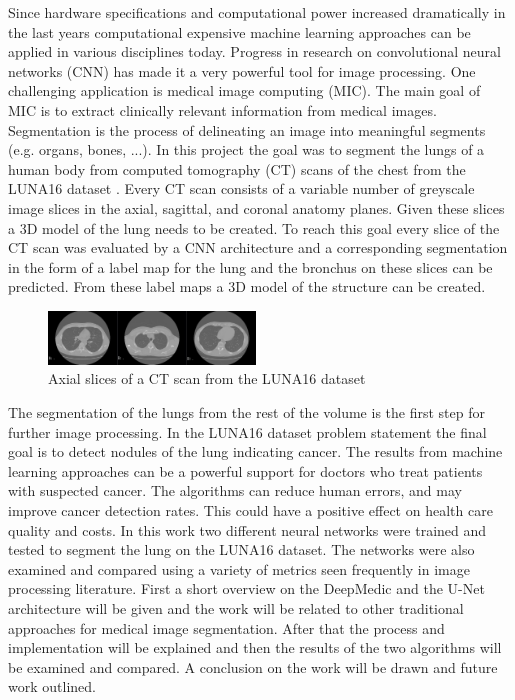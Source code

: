 
Since hardware specifications and computational power increased dramatically in the last years computational expensive machine learning approaches can be applied in various disciplines today. Progress in research on convolutional neural networks (CNN) has made it a very powerful tool for image processing.\newline
One challenging application is medical image computing (MIC). The main goal of MIC is to extract clinically relevant information from medical images. Segmentation is the process of delineating an image into meaningful segments (e.g. organs, bones, ...).\newline
In this project the goal was to segment the lungs of a human body from computed tomography (CT) scans of the chest from the LUNA16 dataset \cite{luna}. Every CT scan consists of a variable number of greyscale image slices in the axial, sagittal, and coronal anatomy planes. Given these slices a 3D model of the lung needs to be created. To reach this goal every slice of the CT scan was evaluated by a CNN architecture and a corresponding segmentation in the form of a label map for the lung and the bronchus on these slices can be predicted. From these label maps a 3D model of the structure can be created. \newline

\begin{figure}[h!]
	\includegraphics[width=0.49\textwidth, angle=0]{files/ctscans.jpg}
	\caption{Axial slices of a CT scan from the LUNA16 dataset}
	\label{scan_picture}
\end{figure}

The segmentation of the lungs from the rest of the volume is the first step for further image processing. In the LUNA16 dataset problem statement the final goal is to detect nodules of the lung indicating cancer. The results from machine learning approaches can be a powerful support for doctors who treat patients with suspected cancer. The algorithms can reduce human errors, and may improve cancer detection rates. This could have a positive effect on health care quality and costs.\newline
In this work two different neural networks were trained and tested to segment the lung on the LUNA16 dataset. The networks were also examined and compared using a variety of metrics seen frequently in image processing literature.\newline
First a short overview on the DeepMedic and the U-Net architecture will be given and the work will be related to other traditional approaches for medical image segmentation. After that the process and implementation will be explained and then the results of the two algorithms will be examined and compared. A conclusion on the work will be drawn and future work outlined.
